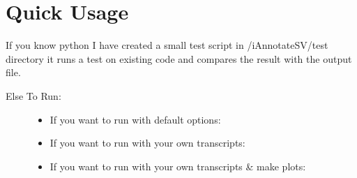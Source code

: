 \documentclass[letterpaper,10pt,english]{sphinxmanual}
\begin{document}
\section{Quick Usage}
\label{\detokenize{iAnnotateSV:quick-usage}}
If you know python I have created a small test script in /iAnnotateSV/test directory it runs a test on existing code and compares the result with the output file.
\begin{description}
\item[{Else To Run:}] \leavevmode\begin{itemize}
\item {} 
If you want to run with default options:

\end{itemize}

\begin{itemize}
\item {} 
If you want to run with your own transcripts:

\end{itemize}

\begin{itemize}
\item {} 
If you want to run with your own transcripts \& make plots:

\end{itemize}


\end{description}
\end{document}
